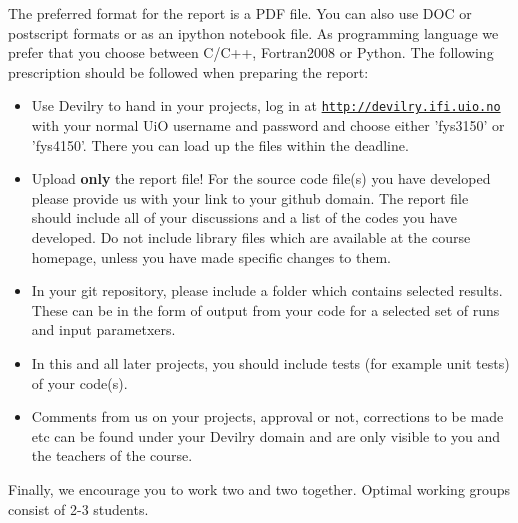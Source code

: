 \documentclass[%
oneside,                 %
final,                   %
10pt]{article}
\begin{document}
The preferred format for the report is a PDF file. You can also use DOC or postscript formats or as an ipython notebook file.  As programming language we prefer that you choose between C/C++, Fortran2008 or Python. The following prescription should be followed when preparing the report:

\begin{itemize}
  \item Use Devilry to hand in your projects, log in  at  \href{{http://devilry.ifi.uio.no}}{\nolinkurl{http://devilry.ifi.uio.no}} with your normal UiO username and password and choose either 'fys3150' or 'fys4150'. There you can load up the files within the deadline.

  \item Upload \textbf{only} the report file!  For the source code file(s) you have developed please provide us with your link to your github domain.  The report file should include all of your discussions and a list of the codes you have developed.  Do not include library files which are available at the course homepage, unless you have made specific changes to them.

  \item In your git repository, please include a folder which contains selected results. These can be in the form of output from your code for a selected set of runs and input parametxers.

  \item In this and all later projects, you should include tests (for example unit tests) of your code(s).

  \item Comments  from us on your projects, approval or not, corrections to be made  etc can be found under your Devilry domain and are only visible to you and the teachers of the course.
\end{itemize}

\noindent
Finally, 
we encourage you to work two and two together. Optimal working groups consist of 
2-3 students. 








\end{document}
